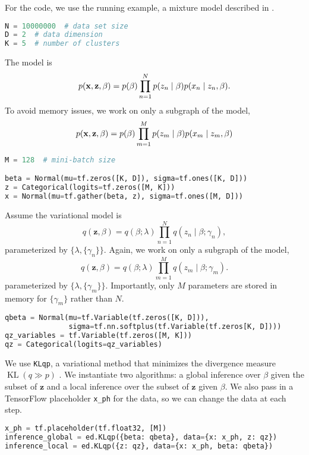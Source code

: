 For the code, we use the running example, a mixture model
described in .
\begin{lstlisting}[language=Python]
N = 10000000  # data set size
D = 2  # data dimension
K = 5  # number of clusters
\end{lstlisting}
The model is
\begin{equation*}
p(\boldsymbol{\mathbf{x}}, \mathbf{z}, \beta)
= p(\beta) \prod_{n=1}^N p(z_n \mid \beta) p(x_n \mid z_n, \beta).
\end{equation*}
To avoid memory issues, we work on only a subgraph of the model,
\begin{equation*}
p(\boldsymbol{\mathbf{x}}, \mathbf{z}, \beta)
= p(\beta) \prod_{m=1}^M p(z_m \mid \beta) p(x_m \mid z_m, \beta)
\end{equation*}
\begin{lstlisting}[language=Python]
M = 128  # mini-batch size

beta = Normal(mu=tf.zeros([K, D]), sigma=tf.ones([K, D]))
z = Categorical(logits=tf.zeros([M, K]))
x = Normal(mu=tf.gather(beta, z), sigma=tf.ones([M, D]))
\end{lstlisting}
Assume the variational model is
\begin{equation*}
q(\mathbf{z}, \beta) =
q(\beta; \lambda) \prod_{n=1}^N q(z_n \mid \beta; \gamma_n),
\end{equation*}
parameterized by $\{\lambda, \{\gamma_n\}\}$.
Again, we work on only a subgraph of the model,
\begin{equation*}
q(\mathbf{z}, \beta) =
q(\beta; \lambda) \prod_{m=1}^M q(z_m \mid \beta; \gamma_m).
\end{equation*}
parameterized by $\{\lambda, \{\gamma_m\}\}$. Importantly, only $M$
parameters are stored in memory for $\{\gamma_m\}$ rather than $N$.
\begin{lstlisting}[language=Python]
qbeta = Normal(mu=tf.Variable(tf.zeros([K, D])),
               sigma=tf.nn.softplus(tf.Variable(tf.zeros[K, D])))
qz_variables = tf.Variable(tf.zeros([M, K]))
qz = Categorical(logits=qz_variables)
\end{lstlisting}
We use \texttt{KLqp}, a variational method that minimizes
the divergence measure $\operatorname{KL}(q\gg p)$
\citep{jordan1999introduction}.
We instantiate two algorithms: a global inference over $\beta$ given
the subset of $\mathbf{z}$ and a local inference over the subset of
$\mathbf{z}$ given $\beta$.
We also pass in a TensorFlow placeholder \texttt{x_ph} for the data,
so we can change the data at each step.
\begin{lstlisting}[language=Python]
x_ph = tf.placeholder(tf.float32, [M])
inference_global = ed.KLqp({beta: qbeta}, data={x: x_ph, z: qz})
inference_local = ed.KLqp({z: qz}, data={x: x_ph, beta: qbeta})
\end{lstlisting}
